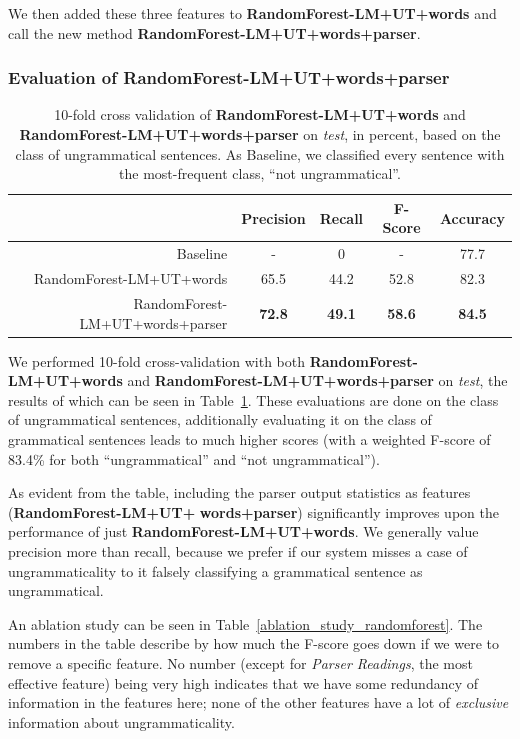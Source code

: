 \documentclass[a4paper,10pt]{scrartcl}
\theoremstyle{style}
\begin{document}
We then added these three features to \textbf{RandomForest-LM+UT+words} and call the new method \textbf{RandomForest-LM+UT+words+parser}.

\subsubsection{Evaluation of RandomForest-LM+UT+words+parser}

\begin{table}
\begin{center}
\begin{tabular}{|r|c|c|c|c|}
  \hline
  & \textbf{Precision} & \textbf{Recall} & \textbf{F-Score} & \textbf{Accuracy}\\
  \hline
  Baseline & - & 0 & - & 77.7\\
  \hline
  RandomForest-LM+UT+words & 65.5 & 44.2 & 52.8 & 82.3\\
  \hline
  RandomForest-LM+UT+words+parser & \textbf{72.8} & \textbf{49.1} & \textbf{58.6} & \textbf{84.5}\\
  \hline
  \end{tabular}
\end{center}
\caption{10-fold cross validation of \textbf{RandomForest-LM+UT+words} and \textbf{RandomForest-LM+UT+words+parser} on \textit{test}, in percent, based on the class of ungrammatical sentences. As Baseline, we classified every sentence with the most-frequent class, ``not ungrammatical''.}
\label{eval_randomforest}
\end{table}


We performed 10-fold cross-validation with both \textbf{RandomForest-LM+UT+words} and \textbf{RandomForest-LM+UT+words+parser} on \textit{test}, the results of which can be seen in Table~\ref{eval_randomforest}. These evaluations are done on the class of ungrammatical sentences, additionally evaluating it on the class of grammatical sentences leads to much higher scores (with a weighted F-score of 83.4\% for both ``ungrammatical'' and ``not ungrammatical'').

As evident from the table, including the parser output statistics as features (\textbf{RandomForest-LM+UT+} \textbf{words+parser}) significantly improves upon the performance of just \textbf{RandomForest-LM+UT+words}. We generally value precision more than recall, because we prefer if our system misses a case of ungrammaticality to it falsely classifying a grammatical sentence as ungrammatical.

An ablation study can be seen in Table~\ref{ablation_study_randomforest}.
The numbers in the table describe by how much the F-score goes down if we were to remove a specific feature.
No number (except for \textit{Parser Readings}, the most effective feature) being very high indicates that we have some redundancy of information in the features here; none of the other features have a lot of \textit{exclusive} information about ungrammaticality.
\end{document}
